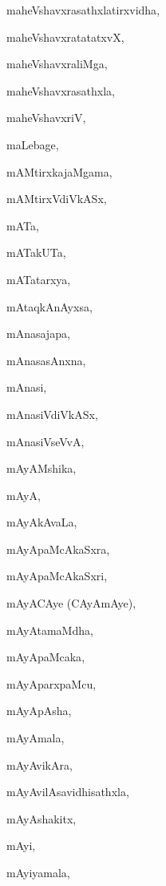 \begin{multicols}{2}
{maheVshavxrasathxlatirxvidha}, \pageref{maheVshavxrasathxlatirxvidha}

{maheVshavxratatatxvX}, \pageref{maheVshavxratatatxvX}

{maheVshavxraliMga}, \pageref{maheVshavxraliMga}

{maheVshavxrasathxla}, \pageref{maheVshavxrasathxla}

{maheVshavxriV}, \pageref{maheVshavxriV}

{maLebage}, \pageref{maLebage}

{mAMtirxkajaMgama}, \pageref{mAMtirxkajaMgama}

{mAMtirxVdiVkASx}, \pageref{mAMtirxVdiVkASx}

{mATa}, \pageref{mATa}

{mATakUTa}, \pageref{mATakUTa}

{mATatarxya}, \pageref{mATatarxya}

{mAtaqkAnAyxsa}, \pageref{mAtaqkAnAyxsa}

{mAnasajapa}, \pageref{mAnasajapa}

{mAnasasAnxna}, \pageref{mAnasasAnxna}

{mAnasi}, \pageref{mAnasi}

{mAnasiVdiVkASx}, \pageref{mAnasiVdiVkASx}

{mAnasiVseVvA}, \pageref{mAnasiVseVvA}

{mAyAMshika}, \pageref{mAyAMshika}

{mAyA}, \pageref{mAyA}

{mAyAkAvaLa}, \pageref{mAyAkAvaLa}

{mAyApaMcAkaSxra}, \pageref{mAyApaMcAkaSxra}

{mAyApaMcAkaSxri}, \pageref{mAyApaMcAkaSxri}

{mAyACAye (CAyAmAye)}, \pageref{mAyACAyeCAyAmAye}

{mAyAtamaMdha}, \pageref{mAyAtamaMdha}

{mAyApaMcaka}, \pageref{mAyApaMcaka}

{mAyAparxpaMcu}, \pageref{mAyAparxpaMcu}

{mAyApAsha}, \pageref{mAyApAsha}

{mAyAmala}, \pageref{mAyAmala}

{mAyAvikAra}, \pageref{mAyAvikAra}

{mAyAvilAsavidhisathxla}, \pageref{mAyAvilAsavidhisathxla}

{mAyAshakitx}, \pageref{mAyAshakitx}

{mAyi}, \pageref{mAyi}

{mAyiyamala}, \pageref{mAyiyamala}


\end{multicols}
